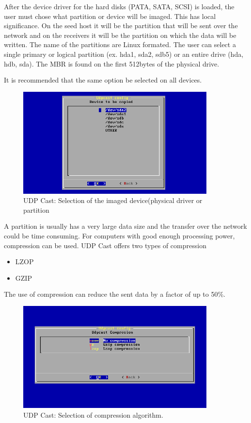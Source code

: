 After the device driver for the hard disks (PATA, SATA, SCSI) is loaded,
the user must chose what partition or device will be imaged. This has local
significance. On the seed host it will be the partition that will be sent over
the network and on the receivers it will be the partition on which the data
will be written. The name of the partitions are Linux formated. The user
can select a single primary or logical partition (ex. hda1, sda2, sdb5) or
an entire drive (hda, hdb, sda). The \ac{MBR} is found on the first 512bytes of
the physical drive.

It is recommended that the same option be selected on all devices.

\begin{figure}[h]
\includegraphics[width=10cm]{img/udpcast_partitions}
\caption{UDP Cast: Selection of the imaged device(physical driver or
partition}
\label{fig:udpcast_partitions}
\end{figure}


A partition is usually has a very large data size and the transfer over the
network could be time consuming. For computers with good enough processing
power, compression can be used. UDP Cast offers two types of compression
\begin{itemize}
\item \ac{LZOP}
\item \ac{GZIP}
\end{itemize}

The use of compression can reduce the sent data by a factor of up to 50\%.

\begin{figure}[h]
\includegraphics[width=10cm]{img/udpcast_compression}
\caption{UDP Cast: Selection of compression algorithm.}
\label{fig:udpcast_compression}
\end{figure}

